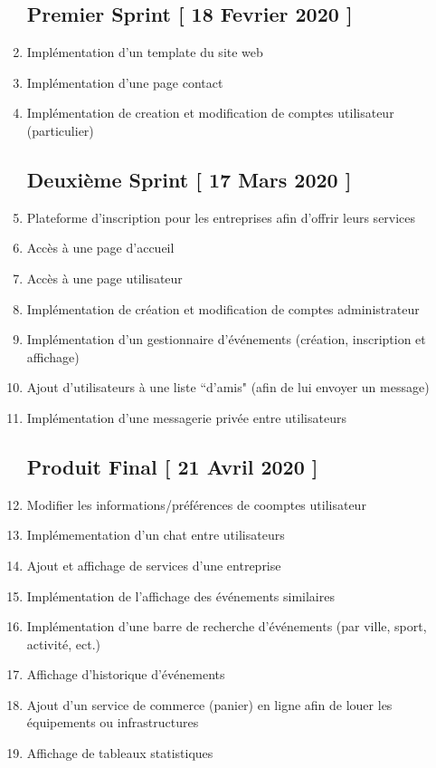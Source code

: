 \documentclass[letter,12pt]{exam}
\begin{document}
\begin{enumerate}

\subsection{Premier Sprint {[} 18 Fevrier 2020
{]}}\label{premier-sprint-18-fevrier-2020}


\tightlist
\item
  Implémentation d'un template du site web
\item
  Implémentation d'une page contact
\item
  Implémentation de creation et modification de comptes utilisateur
  (particulier)

\subsection{Deuxième Sprint {[} 17 Mars 2020
{]}}\label{deuxieme-sprint-17-mars-2020}

\item
  Plateforme d'inscription pour les entreprises afin d'offrir leurs
  services
\item
  Accès à une page d'accueil
\item
  Accès à une page utilisateur
\item
  Implémentation de création et modification de comptes administrateur
\item
  Implémentation d'un gestionnaire d'événements (création, inscription et
  affichage)
\item
  Ajout d'utilisateurs à une liste ``d'amis" (afin de lui envoyer un message)
\item
  Implémentation d'une messagerie privée entre utilisateurs


\subsection{Produit Final {[} 21 Avril 2020
{]}}\label{produit-final-21-avril-2020}


\item
  Modifier les informations/préférences de coomptes utilisateur
\item
  Implémementation d'un chat entre utilisateurs
\item
  Ajout et affichage de services d'une entreprise
\item
  Implémentation de l'affichage des événements similaires
\item
  Implémentation d'une barre de recherche d'événements (par ville,
  sport, activité, ect.)
\item
  Affichage d'historique d'événements
\item
  Ajout d'un service de commerce (panier) en ligne afin de louer les équipements ou infrastructures
\item
  Affichage de tableaux statistiques
\end{enumerate}
\end{document}
